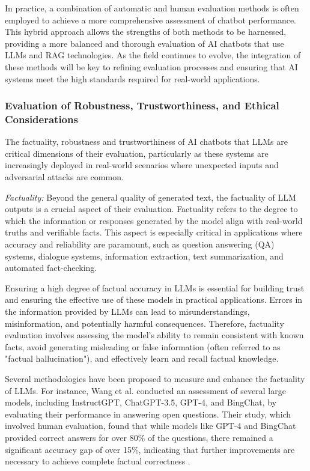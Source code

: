 In practice, a combination of automatic and human evaluation methods is often employed to achieve a more comprehensive assessment of chatbot performance. This hybrid approach allows the strengths of both methods to be harnessed, providing a more balanced and thorough evaluation of AI chatbots that use LLMs and RAG technologies. As the field continues to evolve, the integration of these methods will be key to refining evaluation processes and ensuring that AI systems meet the high standards required for real-world applications.

\subsubsection{Evaluation of Robustness, Trustworthiness, and Ethical Considerations}

The factuality, robustness and trustworthiness of AI chatbots that LLMs are critical dimensions of their evaluation, particularly as these systems are increasingly deployed in real-world scenarios where unexpected inputs and adversarial attacks are common.

\textit{Factuality:} Beyond the general quality of generated text, the factuality of LLM outputs is a crucial aspect of their evaluation. Factuality refers to the degree to which the information or responses generated by the model align with real-world truths and verifiable facts. This aspect is especially critical in applications where accuracy and reliability are paramount, such as question answering (QA) systems, dialogue systems, information extraction, text summarization, and automated fact-checking.

Ensuring a high degree of factual accuracy in LLMs is essential for building trust and ensuring the effective use of these models in practical applications. Errors in the information provided by LLMs can lead to misunderstandings, misinformation, and potentially harmful consequences. Therefore, factuality evaluation involves assessing the model’s ability to remain consistent with known facts, avoid generating misleading or false information (often referred to as "factual hallucination"), and effectively learn and recall factual knowledge.

Several methodologies have been proposed to measure and enhance the factuality of LLMs. For instance, Wang et al. conducted an assessment of several large models, including InstructGPT, ChatGPT-3.5, GPT-4, and BingChat, by evaluating their performance in answering open questions. Their study, which involved human evaluation, found that while models like GPT-4 and BingChat provided correct answers for over 80\% of the questions, there remained a significant accuracy gap of over 15\%, indicating that further improvements are necessary to achieve complete factual correctness \cite{wang2024evaluating}.


